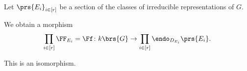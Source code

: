 \documentclass[10pt,a4paper,twoside,openany,hidelinks]{book}
\begin{document}
\begin{proposition}
Let $\prs{E_i}_{i \in [r]}$ be a section of the classes of irreducible representations of $G$.

We obtain a morphism
\[\prod_{i \in [r]} \FF_{E_i} = \Ff \colon k\brs{G} \to \prod_{i \in [r]} \endo_{D_{E_i}}\prs{E_i} \text{.}\]

This is an isomorphism.
\end{proposition}

\begin{comment}
\begin{thebibliography}{2}
\bibitem{context} 
Emily Riehl. 
\textit{Category Theory in Context}. 

\bibitem{nlab}
\textit{nLab - Online Wiki with Focus on Category Theory and Homotopy Theory}.\\
\href{https://ncatlab.org/nlab/show/HomePage}{https://ncatlab.org/nlab/show/HomePage}
\end{thebibliography}
\end{comment}

\backmatter
\end{document}
